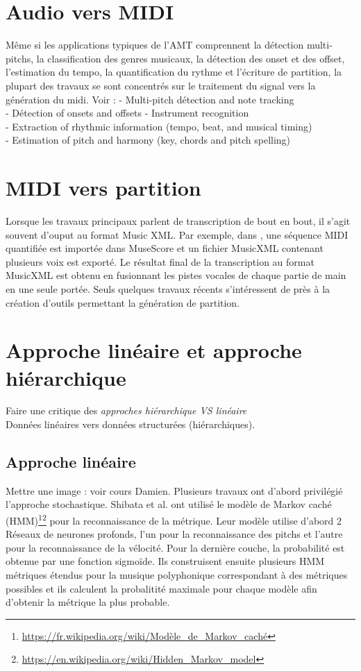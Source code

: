 \section{Audio vers MIDI}
Même si les applications typiques de l'AMT comprennent la détection multi-pitchs, la classification des genres musicaux, la détection des onset et des offset, l'estimation du tempo, la quantification du rythme et l’écriture de partition, la plupart des travaux se sont concentrés sur le traitement du signal vers la génération du midi\cite{article2}.
Voir : \cite{article1}
- Multi-pitch détection and note tracking\\
- Détection of onsets and offsets
- Instrument recognition\\
- Extraction of rhythmic information (tempo, beat, and musical timing)\\
- Estimation of pitch and harmony (key, chords and pitch spelling)
\section{MIDI vers partition}
Lorsque les travaux principaux parlent de transcription de bout en bout, il s’agit souvent d’ouput au format Music XML. Par exemple, dans \cite{SHIBATA2021262}, une séquence MIDI quantifiée est importée dans MuseScore et un fichier MusicXML contenant plusieurs voix est exporté. Le résultat final de la transcription au format MusicXML est obtenu en fusionnant les pistes vocales de chaque partie de main en une seule portée.
Seuls quelques travaux récents \cite{foscarin:hal-01988990} s’intéressent de près à la création d’outils permettant la génération de partition.
\section{Approche linéaire et approche hiérarchique}
Faire une critique des \textit{approches hiérarchique VS linéaire}\\
Données linéaires vers données structurées (hiérarchiques).
\subsection*{Approche linéaire}
Mettre une image : voir cours Damien.
Plusieurs travaux ont d’abord privilégié l’approche stochastique. Shibata et al.\cite{SHIBATA2021262} ont utilisé le modèle de Markov caché (HMM)\footnote{\url{https://fr.wikipedia.org/wiki/Modèle_de_Markov_caché}}\footnote{\url{https://en.wikipedia.org/wiki/Hidden_Markov_model}} pour la reconnaissance de la métrique. Leur modèle utilise d’abord 2 Réseaux de neurones profonds, l’un pour la reconnaissance des pitchs et l’autre pour la reconnaissance de la vélocité. Pour la dernière couche, la probabilité est obtenue par une fonction sigmoïde. Ils construisent ensuite plusieurs HMM métriques étendus pour la musique polyphonique correspondant à des métriques possibles et ils calculent la probalitité maximale pour chaque modèle afin d’obtenir la métrique la plus probable.\\
